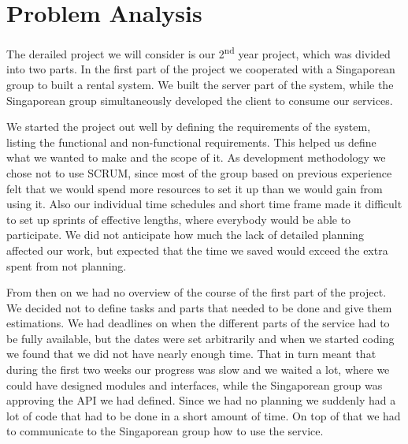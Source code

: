 \section{Problem Analysis}
The derailed project we will consider is our 2\textsuperscript{nd} year project, which was divided into two parts. In the first part of the project we cooperated with a Singaporean group to built a rental system. We built the server part of the system, while the Singaporean group simultaneously developed the client to consume our services.

We started the project out well by defining the requirements of the system, listing the functional and non-functional requirements. This helped us define what we wanted to make and the scope of it.
As development methodology we chose not to use SCRUM, since most of the group based on previous experience felt that we would spend more resources to set it up than we would gain from using it. Also our individual time schedules and short time frame made it difficult to set up sprints of effective lengths, where everybody would be able to participate. We did not anticipate how much the lack of detailed planning affected our work, but expected that the time we saved would exceed the extra spent from not planning.

From then on we had no overview of the course of the first part of the project. We decided not to define tasks and parts that needed to be done and give them estimations.
We had deadlines on when the different parts of the service had to be fully available, but the dates were set arbitrarily and when we started coding we found that we did not have nearly enough time. That in turn meant that during the first two weeks our progress was slow and we waited a lot, where we could have designed modules and interfaces, while the Singaporean group was approving the API we had defined. Since we had no planning we suddenly had a lot of code that had to be done in a short amount of time. On top of that we had to communicate to the Singaporean group how to use the service.
 
